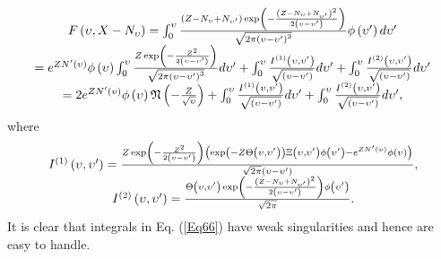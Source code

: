 \documentclass{article}
\begin{document}
\begin{equation}
\begin{array}{c}
F\left( \upsilon ,X-N_{\upsilon }\right) =\int_{0}^{\upsilon }\frac{\left(
Z-N_{\upsilon }+N_{\upsilon ^{\prime }}\right) \exp \left( -\frac{\left(
Z-N_{\upsilon }+N_{\upsilon ^{\prime }}\right) ^{2}}{2\left( \upsilon
-\upsilon ^{\prime }\right) }\right) }{\sqrt{2\pi \left( \upsilon -\upsilon
^{\prime }\right) ^{3}}}\phi \left( \upsilon ^{\prime }\right) d\upsilon
^{\prime } \\ 
=e^{ZN^{\prime }\left( \upsilon \right) }\phi \left( \upsilon \right)
\int_{0}^{\upsilon }\frac{Z\exp \left( -\frac{Z^{2}}{2\left( \upsilon
-\upsilon ^{\prime }\right) }\right) }{\sqrt{2\pi \left( \upsilon -\upsilon
^{\prime }\right) ^{3}}}d\upsilon ^{\prime }+\int_{0}^{\upsilon }\frac{%
I^{\left( 1\right) }\left( \upsilon ,\upsilon ^{\prime }\right) }{\sqrt{%
\left( \upsilon -\upsilon ^{\prime }\right) }}d\upsilon ^{\prime
}+\int_{0}^{\upsilon }\frac{I^{\left( 2\right) }\left( \upsilon ,\upsilon
^{\prime }\right) }{\sqrt{\left( \upsilon -\upsilon ^{\prime }\right) }}%
d\upsilon ^{\prime } \\ 
=2e^{ZN^{\prime }\left( \upsilon \right) }\phi \left( \upsilon \right) 
\mathfrak{N}\left( -\frac{Z}{\sqrt{\upsilon }}\right) +\int_{0}^{\upsilon }%
\frac{I^{\left( 1\right) }\left( \upsilon ,\upsilon ^{\prime }\right) }{%
\sqrt{\left( \upsilon -\upsilon ^{\prime }\right) }}d\upsilon ^{\prime
}+\int_{0}^{\upsilon }\frac{I^{\left( 2\right) }\left( \upsilon ,\upsilon
^{\prime }\right) }{\sqrt{\left( \upsilon -\upsilon ^{\prime }\right) }}%
d\upsilon ^{\prime },%
\end{array}
\label{Eq66}
\end{equation}%
where%
\begin{equation}
\begin{array}{c}
I^{\left( 1\right) }\left( \upsilon ,\upsilon ^{\prime }\right) =\frac{Z\exp
\left( -\frac{Z^{2}}{2\left( \upsilon -\upsilon ^{\prime }\right) }\right)
\left( \exp \left( -Z\Theta \left( \upsilon ,\upsilon ^{\prime }\right)
\right) \Xi \left( \upsilon ,\upsilon ^{\prime }\right) \phi \left( \upsilon
^{\prime }\right) -e^{ZN^{\prime }\left( \upsilon \right) }\phi \left(
\upsilon \right) \right) }{\sqrt{2\pi }\left( \upsilon -\upsilon ^{\prime
}\right) }, \\ 
I^{\left( 2\right) }\left( \upsilon ,\upsilon ^{\prime }\right) =\frac{%
\Theta \left( \upsilon ,\upsilon ^{\prime }\right) \exp \left( -\frac{\left(
Z-N_{\upsilon }+N_{\upsilon ^{\prime }}\right) ^{2}}{2\left( \upsilon
-\upsilon ^{\prime }\right) }\right) \phi \left( \upsilon ^{\prime }\right) 
}{\sqrt{2\pi }}.%
\end{array}
\label{Eq66a}
\end{equation}%
It is clear that integrals in Eq. (\ref{Eq66}) have weak singularities and
hence are easy to handle.
\end{document}
